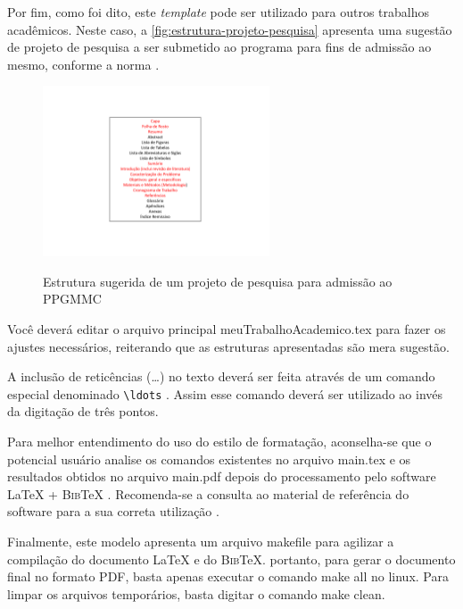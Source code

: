 \begin{apendicesenv}
Por fim, como foi dito, este  \emph{template} pode ser utilizado para outros trabalhos acadêmicos. Neste caso, a \autoref{fig:estrutura-projeto-pesquisa} apresenta uma sugestão de projeto de pesquisa a ser submetido ao programa para fins de admissão ao mesmo, conforme a norma .

\begin{figure}[!htb]
    \centering
    \caption{Estrutura sugerida de um projeto de pesquisa para admissão ao PPGMMC}
    \includegraphics[width=0.6\textwidth]{./04-figuras/estrutura-projeto-pesquisa}
    \label{fig:estrutura-projeto-pesquisa}
\end{figure}

Você deverá editar o arquivo principal {\ttfamily meuTrabalhoAcademico.tex} para fazer os ajustes necessários, reiterando que as estruturas apresentadas são mera sugestão.

A inclusão de reticências (\ldots) no texto deverá ser feita através de um comando especial denominado \verb|\ldots| \cite{LaTeX2014}. Assim esse comando deverá ser utilizado ao invés da digitação de três pontos.

Para melhor entendimento do uso do estilo de formatação, aconselha-se que o potencial usuário analise os comandos existentes no arquivo {\ttfamily main.tex} e os resultados obtidos no arquivo {\ttfamily main.pdf} depois do processamento pelo software \LaTeX{} + \textsc{Bib}\TeX{} \cite{LaTeX2014,BibTeX2014}.
Recomenda-se a consulta ao material de referência do software para a sua correta utilização \cite{Lamport1986,Buerger1989,Kopka2003,Mittelbach2004}.

Finalmente, este modelo apresenta um arquivo {\ttfamily makefile} para agilizar a compilação do documento \LaTeX{} e do \textsc{Bib}\TeX{}. portanto, para gerar o documento final no formato PDF, basta apenas executar o comando {\ttfamily make all} no linux. Para limpar os arquivos temporários, basta digitar o comando {\ttfamily make clean}.


\end{apendicesenv}
